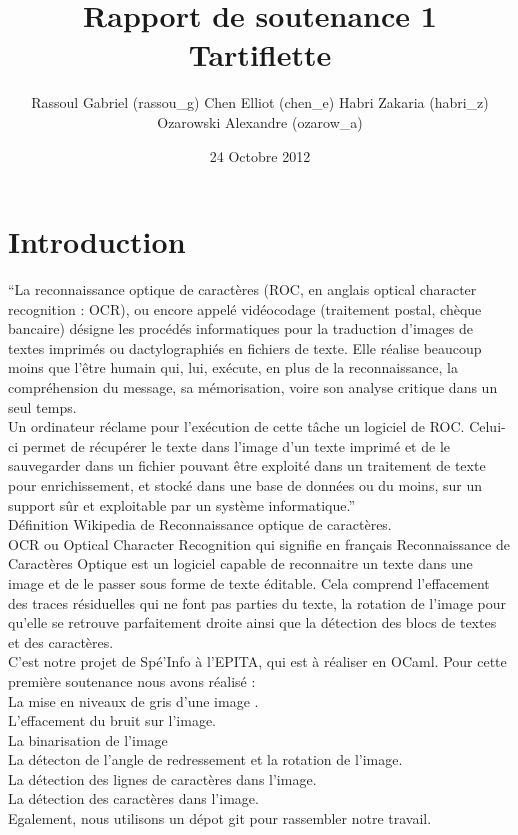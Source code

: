 \documentclass [french,12pt]{article}
\title{Rapport de soutenance 1 \\Tartiflette}
\author{ \andcr \andcr Rassoul Gabriel (rassou\_g) \andcr Chen Elliot (chen\_e) \andcr Habri Zakaria (habri\_z) \andcr Ozarowski Alexandre (ozarow\_a)}
\date{24 Octobre 2012}
\begin{document}
\maketitle
\clearpage
\tableofcontents
\clearpage
\section{Introduction}

“La reconnaissance optique de caractères (ROC, en anglais optical character recognition : OCR), ou encore appelé vidéocodage (traitement postal, chèque bancaire) désigne les procédés informatiques pour la traduction d'images de textes imprimés ou dactylographiés en fichiers de texte. Elle réalise beaucoup moins que l'être humain qui, lui, exécute, en plus de la reconnaissance, la compréhension du message, sa mémorisation, voire son analyse critique dans un seul temps.
\\
Un ordinateur réclame pour l'exécution de cette tâche un logiciel de ROC. Celui-ci permet de récupérer le texte dans l'image d'un texte imprimé et de le sauvegarder dans un fichier pouvant être exploité dans un traitement de texte pour enrichissement, et stocké dans une base de données ou du moins, sur un support sûr et exploitable par un système informatique.”
\\
Définition Wikipedia de Reconnaissance optique de caractères.
\\
OCR ou Optical Character Recognition qui signifie en français Reconnaissance de Caractères Optique est un logiciel capable de reconnaitre un texte dans une image et de le passer sous forme de texte éditable. Cela comprend l’effacement des traces résiduelles qui ne font pas parties du texte, la rotation de l’image pour qu’elle se retrouve parfaitement droite ainsi que la détection des blocs de textes et des caractères.
\\
C’est notre projet de Spé’Info à l’EPITA, qui est à réaliser en OCaml.
Pour cette première soutenance nous avons réalisé :
\\
La mise en niveaux de gris d’une image .
\\
L’effacement du bruit sur l’image.
\\
La binarisation de l’image
\\
La détecton de l’angle de redressement et la rotation de l’image.
\\
La détection des lignes de caractères dans l’image.
\\
La détection des caractères dans l’image.
\\
Egalement, nous utilisons un dépot git pour rassembler notre travail.
\\
\\
\end{document}

